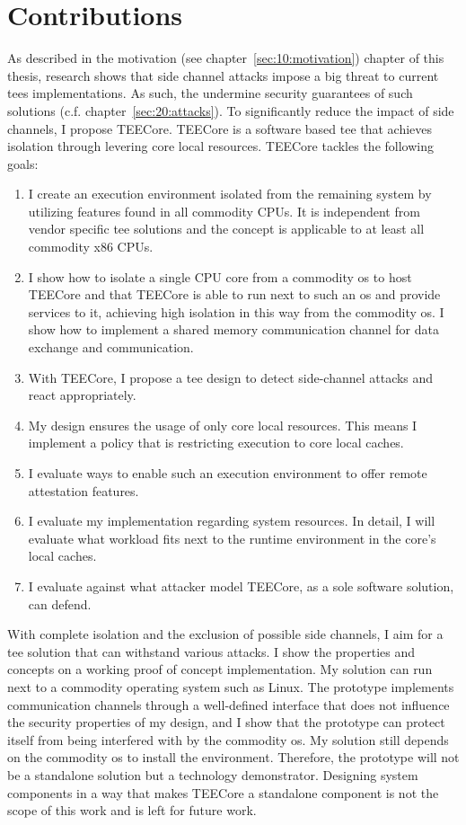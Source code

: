 \section{Contributions}
\label{sec:10:contributions}
As described in the motivation (see chapter~\ref{sec:10:motivation}) chapter of
this thesis, research shows that side channel attacks impose a big threat to
current \glspl{tee} implementations. As such, the undermine security guarantees
of such solutions (c.f. chapter~\ref{sec:20:attacks}). To significantly reduce
the impact of side channels, I propose TEECore. TEECore is a software based
\gls{tee} that achieves isolation through levering core local resources. TEECore
tackles the following goals:

\begin{enumerate}
  \item I create an execution environment isolated from the remaining system by
    utilizing features found in all commodity CPUs. It is independent from
    vendor specific \gls{tee} solutions and the concept is applicable to at
    least all commodity x86 CPUs.
  \item I show how to isolate a single CPU core from a commodity \gls{os} to
    host TEECore and that TEECore is able to run next to such an \gls{os} and
    provide services to it, achieving high isolation in this way from the
    commodity \gls{os}. I show how to implement a shared memory communication
    channel for data exchange and communication.
  \item With TEECore, I propose a \gls{tee} design to detect side-channel
    attacks and react appropriately.
  \item My design ensures the usage of only core local resources. This means I
    implement a policy that is restricting execution to core local caches.
  \item I evaluate ways to enable such an execution environment to offer
    remote attestation features.
  \item I evaluate my implementation regarding system resources. In detail, I
    will evaluate what workload fits next to the runtime environment in the
    core's local caches.
  \item I evaluate against what attacker model TEECore, as a sole software
    solution, can defend.
\end{enumerate}

With complete isolation and the exclusion of possible side channels, I aim for a
\gls{tee} solution that can withstand various attacks. I show the properties and
concepts on a working proof of concept implementation. My solution can run next
to a commodity operating system such as Linux. The prototype implements
communication channels through a well-defined interface that does not influence
the security properties of my design, and I show that the prototype can protect
itself from being interfered with by the commodity \gls{os}. My solution still
depends on the commodity \gls{os} to install the environment. Therefore, the
prototype will not be a standalone solution but a technology demonstrator.
Designing system components in a way that makes TEECore a standalone component
is not the scope of this work and is left for future work.

